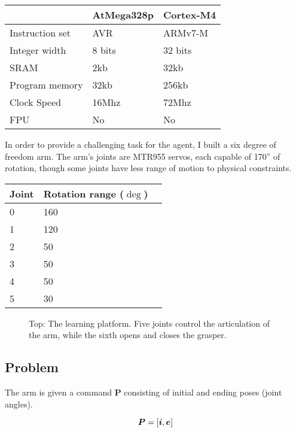 \documentclass{article}
\newcommand{\bP}{\bm{P}}
\newcommand{\be}{\bm{e}}
\begin{document}
\begin{center}
	\begin{tabular}{ l l l}
		& AtMega328p & Cortex-M4  \\ \midrule
		Instruction set & AVR & ARMv7-M\\
		Integer width & 8 bits & 32 bits\\
		SRAM & 2kb & 32kb\\
		Program memory & 32kb & 256kb\\
		Clock Speed & 16Mhz & 72Mhz\\ 
		FPU & No & No
		
	\end{tabular}
\end{center}

In order to provide a challenging task for the agent, I built a six degree of freedom arm. The arm's joints are MTR955 servos, each capable of 170$\degree$ of rotation, though some joints have less range of motion to physical constraints.

\begin{center}
	\begin{tabular}{ l l l}
		Joint & Rotation range ($\deg$)  \\ \midrule
		0 & 160 \\
		1 & 120 \\
		2 & 50 \\
		3 & 50 \\
		4 & 50\\ 
		5 & 30
		
	\end{tabular}
\end{center}

\begin{figure}
	\centering
	\caption{Top: The learning platform. Five joints control the articulation of the arm, while the sixth opens and closes the grasper.}
	\label{fig:platform}
\end{figure}


\subsection{Problem}

The arm is given a command $\bP$ consisting of initial and ending poses (joint angles).

\begin{equation}
	\bP = [\bm{i}, \be]\\
\end{equation}
\end{document}
